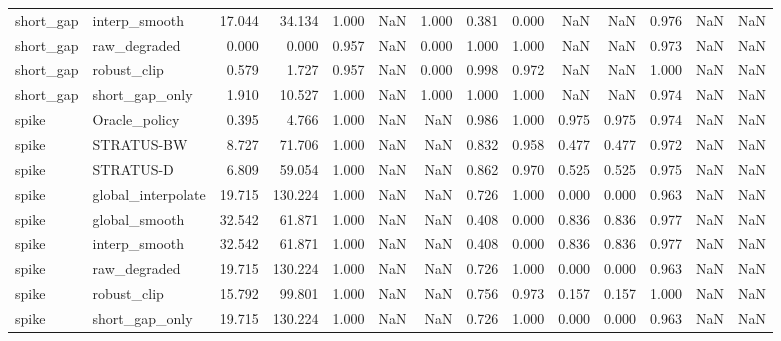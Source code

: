 \begin{tabular}{llrrrrrrrrrrrr}
short_gap & interp_smooth & 17.044 & 34.134 & 1.000 & NaN & 1.000 & 0.381 & 0.000 & NaN & NaN & 0.976 & NaN & NaN \\
short_gap & raw_degraded & 0.000 & 0.000 & 0.957 & NaN & 0.000 & 1.000 & 1.000 & NaN & NaN & 0.973 & NaN & NaN \\
short_gap & robust_clip & 0.579 & 1.727 & 0.957 & NaN & 0.000 & 0.998 & 0.972 & NaN & NaN & 1.000 & NaN & NaN \\
short_gap & short_gap_only & 1.910 & 10.527 & 1.000 & NaN & 1.000 & 1.000 & 1.000 & NaN & NaN & 0.974 & NaN & NaN \\
spike & Oracle_policy & 0.395 & 4.766 & 1.000 & NaN & NaN & 0.986 & 1.000 & 0.975 & 0.975 & 0.974 & NaN & NaN \\
spike & STRATUS-BW & 8.727 & 71.706 & 1.000 & NaN & NaN & 0.832 & 0.958 & 0.477 & 0.477 & 0.972 & NaN & NaN \\
spike & STRATUS-D & 6.809 & 59.054 & 1.000 & NaN & NaN & 0.862 & 0.970 & 0.525 & 0.525 & 0.975 & NaN & NaN \\
spike & global_interpolate & 19.715 & 130.224 & 1.000 & NaN & NaN & 0.726 & 1.000 & 0.000 & 0.000 & 0.963 & NaN & NaN \\
spike & global_smooth & 32.542 & 61.871 & 1.000 & NaN & NaN & 0.408 & 0.000 & 0.836 & 0.836 & 0.977 & NaN & NaN \\
spike & interp_smooth & 32.542 & 61.871 & 1.000 & NaN & NaN & 0.408 & 0.000 & 0.836 & 0.836 & 0.977 & NaN & NaN \\
spike & raw_degraded & 19.715 & 130.224 & 1.000 & NaN & NaN & 0.726 & 1.000 & 0.000 & 0.000 & 0.963 & NaN & NaN \\
spike & robust_clip & 15.792 & 99.801 & 1.000 & NaN & NaN & 0.756 & 0.973 & 0.157 & 0.157 & 1.000 & NaN & NaN \\
spike & short_gap_only & 19.715 & 130.224 & 1.000 & NaN & NaN & 0.726 & 1.000 & 0.000 & 0.000 & 0.963 & NaN & NaN \\
\bottomrule
\end{tabular}

